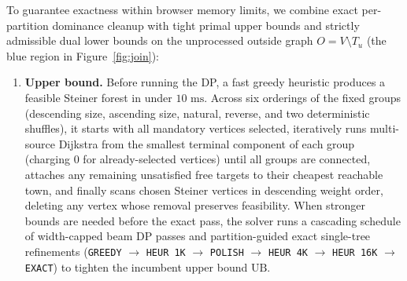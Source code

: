 \documentclass[11pt]{article}
\theoremstyle{definition}
\theoremstyle{remark}
\begin{document}
To guarantee exactness within browser memory limits, we combine exact per-partition dominance cleanup with tight primal upper bounds and strictly admissible dual lower bounds on the unprocessed outside graph $O = V \setminus T_u$ (the blue region in Figure~\ref{fig:join}):

\begin{enumerate}
    \item[$\bullet$] \textbf{Upper bound.} Before running the DP, a fast greedy heuristic produces a feasible Steiner forest in under $10\text{ ms}$. Across six orderings of the fixed groups (descending size, ascending size, natural, reverse, and two deterministic shuffles), it starts with all mandatory vertices selected, iteratively runs multi-source Dijkstra from the smallest terminal component of each group (charging $0$ for already-selected vertices) until all groups are connected, attaches any remaining unsatisfied free targets to their cheapest reachable town, and finally scans chosen Steiner vertices in descending weight order, deleting any vertex whose removal preserves feasibility. When stronger bounds are needed before the exact pass, the solver runs a cascading schedule of width-capped beam DP passes and partition-guided exact single-tree refinements (\texttt{GREEDY} $\to$ \texttt{HEUR 1K} $\to$ \texttt{POLISH} $\to$ \texttt{HEUR 4K} $\to$ \texttt{HEUR 16K} $\to$ \texttt{EXACT}) to tighten the incumbent upper bound $\mathrm{UB}$.


\end{enumerate}
\end{document}
